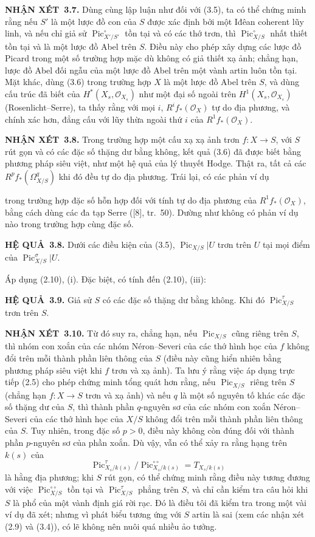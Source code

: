 \documentclass[11pt,twoside,openany]{book}
\numberwithin{equation}{section}
\newcommand{\src}[1]{%
  \phantomsection\hypertarget{src:\fgasourceid:#1}{}%
  \marginpar{\raggedleft\footnotesize\sffamily #1}%
}
\newcommand{\fgasourceid}{unset}
\newcommand{\result}[2]{\par\medskip\noindent\textbf{#1\if\relax\detokenize{#2}\relax\else\ #2\fi.}\quad}
\begin{document}
\result{NHẬN XÉT}{3.7} Dùng cùng lập luận như đối với (3.5), ta có thể chứng
minh rằng nếu $S'$ là một lược đồ con của $S$ được xác định bởi một Iđêan
coherent lũy linh, và nếu chỉ giả sử $\operatorname{Pic}_{X'/S'}^\circ$ tồn
tại và có các thớ trơn, thì $\operatorname{Pic}_{X/S}^\circ$ nhất thiết tồn
tại và là một lược đồ Abel trên $S$. Điều này cho phép xây dựng các lược đồ
Picard trong một số trường hợp mặc dù không có giả thiết xạ ảnh; chẳng hạn,
lược đồ Abel đối ngẫu của một lược đồ Abel trên một vành artin luôn tồn tại.
Mặt khác, dùng (3.6) trong trường hợp $X$ là một lược đồ Abel trên $S$, và dùng
cấu trúc đã biết của $H^*(X_s,\mathcal O_{X_s})$ như một đại số ngoài trên
$H^1(X_s,\mathcal O_{X_s})$ (Rosenlicht--Serre), ta thấy rằng với mọi $i$,
$R^if_*(\mathcal O_X)$ tự do địa phương, và chính xác hơn, đẳng cấu với lũy
thừa ngoài thứ $i$ của $R^1f_*(\mathcal O_X)$.

\result{NHẬN XÉT}{3.8} Trong trường hợp một cấu xạ xạ ảnh trơn
$f:X\longrightarrow S$, với $S$ rút gọn và có các đặc số thặng dư bằng không,
kết quả (3.6) đã được biết bằng phương pháp siêu việt, như một hệ quả của lý
thuyết Hodge. Thật ra, tất cả các $R^pf_*(\Omega^q_{X/S})$ khi đó đều tự do
địa phương. Trái lại, có các phản ví dụ
\src{241}
trong trường hợp đặc số hỗn hợp đối với tính tự do địa phương của
$R^1f_*(\mathcal O_X)$, bằng cách dùng các đa tạp Serre ([8], tr.~50). Dường
như không có phản ví dụ nào trong trường hợp cùng đặc số.

\result{HỆ QUẢ}{3.8} Dưới các điều kiện của (3.5),
$\operatorname{Pic}_{X/S}|U$ trơn trên $U$ tại mọi điểm của
$\operatorname{Pic}_{X/S}^\sigma|U$.

Áp dụng (2.10), (i). Đặc biệt, có tính đến (2.10), (iii):

\result{HỆ QUẢ}{3.9} Giả sử $S$ có các đặc số thặng dư bằng không. Khi đó
$\operatorname{Pic}_{X/S}^\tau$ trơn trên $S$.

\result{NHẬN XÉT}{3.10} Từ đó suy ra, chẳng hạn, nếu
$\operatorname{Pic}_{X/S}$ cũng riêng trên $S$, thì nhóm con xoắn của các
nhóm Néron--Severi của các thớ hình học của $f$ không đổi trên mỗi thành phần
liên thông của $S$ (điều này cũng hiển nhiên bằng phương pháp siêu việt khi
$f$ trơn và xạ ảnh). Ta lưu ý rằng việc áp dụng trực tiếp (2.5) cho phép chứng
minh tổng quát hơn rằng, nếu $\operatorname{Pic}_{X/S}$ riêng trên $S$ (chẳng
hạn $f:X\longrightarrow S$ trơn và xạ ảnh) và nếu $q$ là một số nguyên tố
khác các đặc số thặng dư của $S$, thì thành phần $q$-nguyên sơ của các nhóm
con xoắn Néron--Severi của các thớ hình học của $X/S$ không đổi trên mỗi thành
phần liên thông của $S$. Tuy nhiên, trong đặc số $p>0$, điều này không còn đúng
đối với thành phần $p$-nguyên sơ của phần xoắn. Dù vậy, vẫn có thể xảy ra rằng
hạng trên $k(s)$ của
\[
\operatorname{Pic}_{X_s/k(s)}^\tau/
\operatorname{Pic}_{X_s/k(s)}^{\circ\circ}=T_{X_s/k(s)}
\]
là hằng địa phương; khi $S$ rút gọn, có thể chứng minh rằng điều này tương
đương với việc $\operatorname{Pic}_{X/S}^{\circ\circ}$ tồn tại và
$\operatorname{Pic}_{X/S}^\tau$ phẳng trên $S$, và chỉ cần kiểm tra câu hỏi
khi $S$ là phổ của một vành định giá rời rạc. Đó là điều tôi đã kiểm tra trong
một vài ví dụ đã xét; nhưng vì phát biểu tương ứng với $S$ artin là sai (xem
các nhận xét (2.9) và (3.4)), có lẽ không nên nuôi quá nhiều ảo tưởng.
\end{document}
